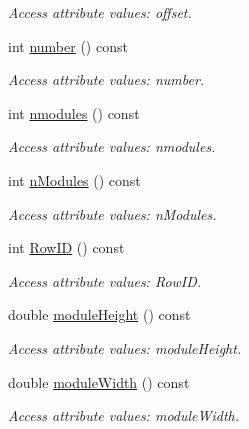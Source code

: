 \begin{DoxyCompactItemize}
\begin{DoxyCompactList}\small\item\em Access attribute values: offset. \item\end{DoxyCompactList}\item 
int \hyperlink{struct_d_d4hep_1_1_x_m_l_1_1_child_value_a90e3cafc587a8ac9899593d4f43e01a4}{number} () const 
\begin{DoxyCompactList}\small\item\em Access attribute values: number. \item\end{DoxyCompactList}\item 
int \hyperlink{struct_d_d4hep_1_1_x_m_l_1_1_child_value_abc8cdb6358a8b287a82024f9e7b3e798}{nmodules} () const 
\begin{DoxyCompactList}\small\item\em Access attribute values: nmodules. \item\end{DoxyCompactList}\item 
int \hyperlink{struct_d_d4hep_1_1_x_m_l_1_1_child_value_a7cf1ade5a453e27222fe31cf8872df3e}{nModules} () const 
\begin{DoxyCompactList}\small\item\em Access attribute values: nModules. \item\end{DoxyCompactList}\item 
int \hyperlink{struct_d_d4hep_1_1_x_m_l_1_1_child_value_aa2946fe9fb149083ff6e803bea04d7d8}{RowID} () const 
\begin{DoxyCompactList}\small\item\em Access attribute values: RowID. \item\end{DoxyCompactList}\item 
double \hyperlink{struct_d_d4hep_1_1_x_m_l_1_1_child_value_a1db2990dc4eff71eae498a9a47dc3a33}{moduleHeight} () const 
\begin{DoxyCompactList}\small\item\em Access attribute values: moduleHeight. \item\end{DoxyCompactList}\item 
double \hyperlink{struct_d_d4hep_1_1_x_m_l_1_1_child_value_a2ee08d0162fff1ea65ec7b81885758bf}{moduleWidth} () const 
\begin{DoxyCompactList}\small\item\em Access attribute values: moduleWidth. \item\end{DoxyCompactList}\item 

\end{DoxyCompactItemize}

